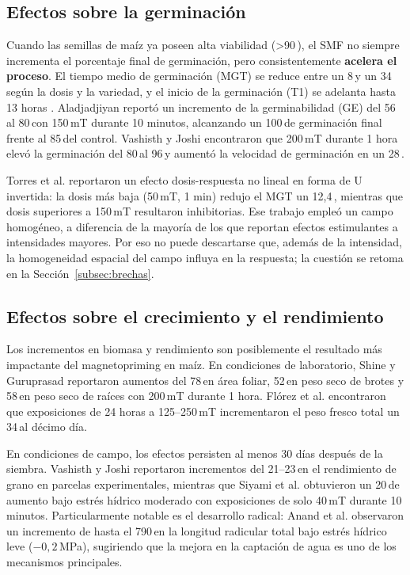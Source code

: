 \subsection{Efectos sobre la germinación}

Cuando las semillas de maíz ya poseen alta viabilidad (>90\,\pct), el SMF no siempre incrementa el porcentaje final de germinación, pero consistentemente \textbf{acelera el proceso}. El tiempo medio de germinación (MGT) se reduce entre un 8\,\pct y un 34\,\pct según la dosis y la variedad, y el inicio de la germinación (T1) se adelanta hasta 13 horas \cite{martinez_2017, florez_2007, torres_2019}. Aladjadjiyan \cite{aladjadjiyan_2002} reportó un incremento de la germinabilidad (GE) del 56\,\pct al 80\,\pct con 150\,mT durante 10 minutos, alcanzando un 100\,\pct de germinación final frente al 85\,\pct del control. Vashisth y Joshi \cite{vashisth_joshi_2017} encontraron que 200\,mT durante 1 hora elevó la germinación del 80\,\pct al 96\,\pct y aumentó la velocidad de germinación en un 28\,\pct.

Torres et al. \cite{torres_2019} reportaron un efecto dosis-respuesta no lineal en forma de U invertida: la dosis más baja (50\,mT, 1 min) redujo el MGT un 12,4\,\pct, mientras que dosis superiores a 150\,mT resultaron inhibitorias. Ese trabajo empleó un campo homogéneo, a diferencia de la mayoría de los que reportan efectos estimulantes a intensidades mayores. Por eso no puede descartarse que, además de la intensidad, la homogeneidad espacial del campo influya en la respuesta; la cuestión se retoma en la Sección~\ref{subsec:brechas}.

\subsection{Efectos sobre el crecimiento y el rendimiento}

Los incrementos en biomasa y rendimiento son posiblemente el resultado más impactante del magnetopriming en maíz. En condiciones de laboratorio, Shine y Guruprasad \cite{shine_guruprasad_2012} reportaron aumentos del 78\,\pct en área foliar, 52\,\pct en peso seco de brotes y 58\,\pct en peso seco de raíces con 200\,mT durante 1 hora. Flórez et al. \cite{florez_2007} encontraron que exposiciones de 24 horas a 125--250\,mT incrementaron el peso fresco total un 34\,\pct al décimo día.

En condiciones de campo, los efectos persisten al menos 30 días después de la siembra. Vashisth y Joshi \cite{vashisth_joshi_2017} reportaron incrementos del 21--23\,\pct en el rendimiento de grano en parcelas experimentales, mientras que Siyami et al. \cite{siyami_2018} obtuvieron un 20\,\pct de aumento bajo estrés hídrico moderado con exposiciones de solo 40\,mT durante 10 minutos. Particularmente notable es el desarrollo radical: Anand et al. \cite{anand_2012} observaron un incremento de hasta el 790\,\pct en la longitud radicular total bajo estrés hídrico leve ($-0{,}2$\,MPa), sugiriendo que la mejora en la captación de agua es uno de los mecanismos principales.

